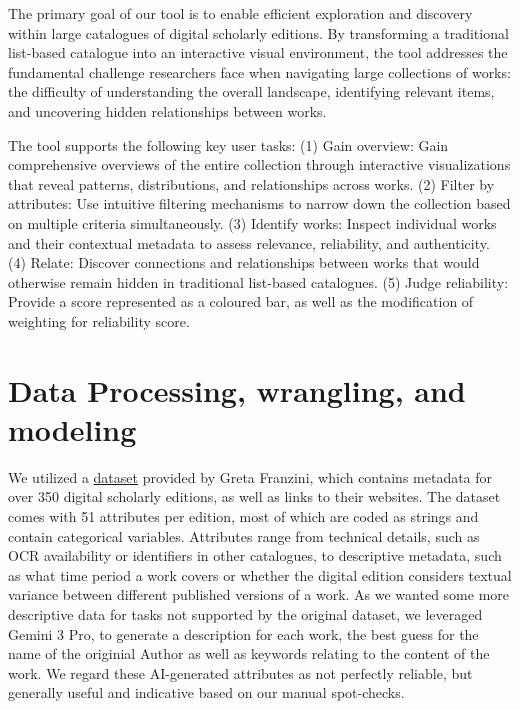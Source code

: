 \documentclass{article}
\begin{document}
The primary goal of our tool is to enable efficient exploration and discovery within large catalogues of digital scholarly editions. 
By transforming a traditional list-based catalogue into an interactive visual environment, the tool addresses the fundamental challenge 
researchers face when navigating large collections of works: the difficulty of understanding the overall landscape, identifying relevant 
items, and uncovering hidden relationships between works.

The tool supports the following key user tasks:
(1) Gain overview: Gain comprehensive overviews of the entire collection through interactive visualizations that reveal patterns, 
distributions, and relationships across works.
(2) Filter by attributes: Use intuitive filtering mechanisms to narrow down the collection based on multiple criteria simultaneously.
(3) Identify works: Inspect individual works and their contextual metadata to assess relevance, reliability, and authenticity.
(4) Relate: Discover connections and relationships between works that would otherwise remain hidden in traditional list-based catalogues.
(5) Judge reliability: Provide a score represented as a coloured bar, as well as the modification of weighting for reliability score.

\section{Data Processing, wrangling, and modeling}

We utilized a \href{https://github.com/dig-Eds-cat/digEds_cat/blob/main/digEds_cat.csv}{dataset} provided by Greta Franzini, which contains metadata for over 350 digital scholarly editions, as well as links to their websites.
The dataset comes with 51 attributes per edition, most of which are coded as strings and contain categorical variables.  
Attributes range from technical details, such as OCR availability or identifiers in other catalogues, to descriptive metadata, 
such as what time period a work covers or whether the digital edition considers textual variance between different published versions of a work.
As we wanted some more descriptive data for tasks not supported by the original dataset, we leveraged Gemini 3 Pro, to generate a description for each work,
the best guess for the name of the originial Author as well as keywords relating to the content of the work. We regard these AI-generated attributes 
as not perfectly reliable, but generally useful and indicative based on our manual spot-checks.
\end{document}
